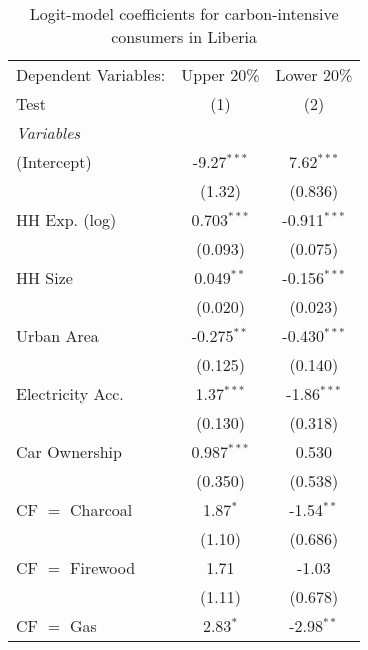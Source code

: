 
\begin{table}[htbp!]
   \centering
   \small
   \begin{adjustbox}{width = 1\textwidth, max height = 0.95\textheight, center}
      \begin{threeparttable}[b]
         \caption{\label{tab:Logit_1_LBR} Logit-model coefficients for carbon-intensive consumers in Liberia}
         \begin{tabular}{lcc}
            \tabularnewline \midrule \midrule
            Dependent Variables: & Upper 20\%    & Lower 20\%\\   
            Test                 & (1)           & (2)\\  
            \midrule
            \emph{Variables}\\
            (Intercept)          & -9.27$^{***}$ & 7.62$^{***}$\\   
                                 & (1.32)        & (0.836)\\   
            HH Exp. (log)        & 0.703$^{***}$ & -0.911$^{***}$\\   
                                 & (0.093)       & (0.075)\\   
            HH Size              & 0.049$^{**}$  & -0.156$^{***}$\\   
                                 & (0.020)       & (0.023)\\   
            Urban Area           & -0.275$^{**}$ & -0.430$^{***}$\\   
                                 & (0.125)       & (0.140)\\   
            Electricity Acc.     & 1.37$^{***}$  & -1.86$^{***}$\\   
                                 & (0.130)       & (0.318)\\   
            Car Ownership        & 0.987$^{***}$ & 0.530\\   
                                 & (0.350)       & (0.538)\\   
            CF $=$ Charcoal      & 1.87$^{*}$    & -1.54$^{**}$\\   
                                 & (1.10)        & (0.686)\\   
            CF $=$ Firewood      & 1.71          & -1.03\\   
                                 & (1.11)        & (0.678)\\   
            CF $=$ Gas           & 2.83$^{*}$    & -2.98$^{**}$\\   

\end{tabular}
\end{threeparttable}
\end{adjustbox}
\end{table}
